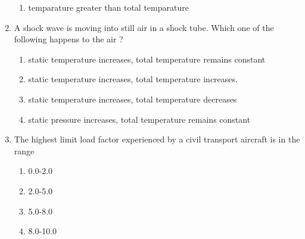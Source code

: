 \documentclass[journal,12pt,onecolumn]{IEEEtran}
\theoremstyle{remark}
\begin{document}
\begin{enumerate}
\begin{enumerate}
    \item temparature greater than total temparature
\end{enumerate}
\item A shock wave is moving into still air in a shock tube. Which one of the following happens to the air ?
\begin{enumerate}
    \item static temperature increases, total temperature remains constant
    \item static temperature increases, total temperature increases.
    \item static temperature increases, total temperature decreases
    \item static pressure increases, total temperature remains constant
\end{enumerate}
\item The highest limit load factor experienced by a civil transport aircraft is in the range
\begin{enumerate}
    \item 0.0-2.0
    \item 2.0-5.0
    \item 5.0-8.0
    \item 8.0-10.0
\end{enumerate}
\end{enumerate}
\end{document}
